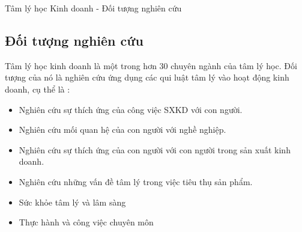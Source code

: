 \documentclass[../main.tex]{subfiles}
\begin{document}
\begin{frame}{Tâm lý học Kinh doanh - Đối tượng nghiên cứu}
\subsection{Đối tượng nghiên cứu}
Tâm lý học kinh doanh là một trong hơn 30 chuyên ngành của tâm lý học. Đối tượng của nó là nghiên cứu ứng dụng các qui luật tâm lý vào hoạt động kinh doanh, cụ thể là :
\begin{itemize}
    \item Nghiên cứu sự thích ứng của công việc SXKD với con người.
    \item Nghiên cứu mối quan hệ của con người với nghề nghiệp.
    \item Nghiên cứu sự thích ứng của con người với con người trong sản xuất kinh doanh.
    \item  Nghiên cứu những vấn đề tâm lý trong việc tiêu thụ sản phẩm.
    \item Sức khỏe tâm lý và lâm sàng
    \item Thực hành và công việc chuyên môn

\end{itemize}

\end{frame}
\end{document}
